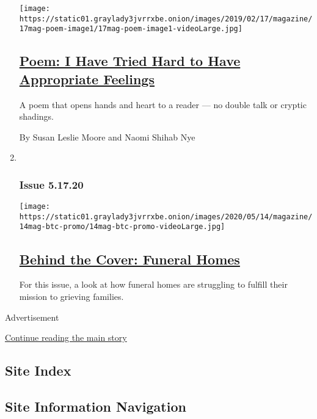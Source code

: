 \begin{enumerate}
  \texttt{[image: https://static01.graylady3jvrrxbe.onion/images/2019/02/17/magazine/17mag-poem-image1/17mag-poem-image1-videoLarge.jpg]}

  \hypertarget{poem-i-have-tried-hard-to-have-appropriate-feelings}{%
  \subsection{\texorpdfstring{\href{/2020/05/14/magazine/poem-i-have-tried-hard-to-have-appropriate-feelings.html}{Poem:
  I Have Tried Hard to Have Appropriate
  Feelings}}{Poem: I Have Tried Hard to Have Appropriate Feelings}}\label{poem-i-have-tried-hard-to-have-appropriate-feelings}}

  A poem that opens hands and heart to a reader --- no double talk or
  cryptic shadings.

  By Susan Leslie Moore and Naomi Shihab Nye
\item ~
  \hypertarget{issue-51720}{%
  \subsubsection{Issue 5.17.20}\label{issue-51720}}

  \texttt{[image: https://static01.graylady3jvrrxbe.onion/images/2020/05/14/magazine/14mag-btc-promo/14mag-btc-promo-videoLarge.jpg]}

  \hypertarget{behind-the-cover-funeral-homes}{%
  \subsection{\texorpdfstring{\href{/2020/05/14/magazine/behind-the-cover-funeral-homes.html}{Behind
  the Cover: Funeral
  Homes}}{Behind the Cover: Funeral Homes}}\label{behind-the-cover-funeral-homes}}

  For this issue, a look at how funeral homes are struggling to fulfill
  their mission to grieving families.
\end{enumerate}

Advertisement

\protect\hyperlink{after-mid1}{Continue reading the main story}

\hypertarget{site-index}{%
\subsection{Site Index}\label{site-index}}

\hypertarget{site-information-navigation}{%
\subsection{Site Information
Navigation}\label{site-information-navigation}}

